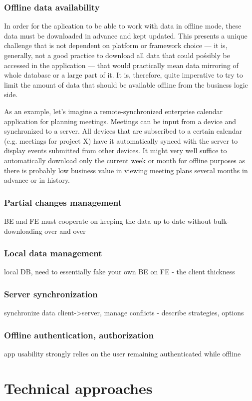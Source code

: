 \documentclass[
  digital,     %
  color,       %
  oneside,     %
  nosansbold,  %
  nocolorbold, %
  lof,         %
  lot,         %
]{fithesis4}
\begin{document}
\subsection{Offline data availability}
In order for the aplication to be able to work with data in offline mode, these data must be downloaded in advance and kept updated. This presents a unique challenge that is not dependent on platform or framework choice --- it is, generally, not a good practice to download all data that could pośsibly be accessed in the application --- that would practically mean data mirroring of whole database or a large part of it. It is, therefore, quite imperative to try to limit the amount of data that should be available offline from the business logic side.

As an example, let's imagine a remote-synchronized enterprise calendar application for planning meetings. Meetings can be input from a device and synchronized to a server. All devices that are subscribed to a certain calendar (e.g. meetings for project X) have it automatically synced with the server to display events submitted from other devices. It might very well suffice to automatically download only the current week or month for offline purposes as there is probably low business value in viewing meeting plans several months in advance or in history. 
\subsection{Partial changes management}
BE and FE must cooperate on keeping the data up to date without bulk-downloading over and over
\subsection{Local data management}
local DB, need to essentially fake your own BE on FE - the client thickness
\subsection{Server synchronization}
synchronize data client->server, manage conflicts - describe strategies, options
\subsection{Offline authentication, authorization}
app usability strongly relies on the user remaining authenticated while offline

\chapter{Technical approaches}
\end{document}
